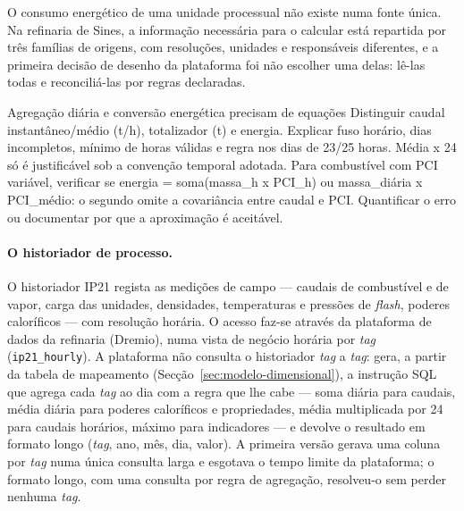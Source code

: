 O consumo energético de uma unidade processual não existe numa fonte
única. Na refinaria de Sines, a informação necessária para o calcular está
repartida por três famílias de origens, com resoluções, unidades e
responsáveis diferentes, e a primeira decisão de desenho da plataforma foi
não escolher uma delas: lê-las todas e reconciliá-las por regras
declaradas.

{Agregação diária e conversão energética precisam de equações}
{Distinguir caudal instantâneo/médio (t/h), totalizador (t) e energia.
Explicar fuso horário, dias incompletos, mínimo de horas válidas e regra
nos dias de 23/25 horas. Média x 24 só é justificável sob a convenção
temporal adotada. Para combustível com PCI variável, verificar se
energia = soma(massa\_h x PCI\_h) ou massa\_diária x PCI\_médio:
o segundo omite a covariância entre caudal e PCI. Quantificar o erro
ou documentar por que a aproximação é aceitável.}%
\paragraph{O historiador de processo.} O historiador IP21 regista as
medições de campo --- caudais de combustível e de vapor, carga das
unidades, densidades, temperaturas e pressões de \emph{flash}, poderes
caloríficos --- com resolução horária. O acesso faz-se através da
plataforma de dados da refinaria (Dremio), numa vista de negócio horária
por \emph{tag} (\texttt{ip21\_hourly}). A plataforma não consulta o
historiador \emph{tag} a \emph{tag}: gera, a partir da tabela de mapeamento
(Secção~\ref{sec:modelo-dimensional}), a instrução SQL que agrega cada
\emph{tag} ao dia com a regra que lhe cabe --- soma diária para caudais,
média diária para poderes caloríficos e propriedades, média multiplicada
por 24 para caudais horários, máximo para indicadores --- e devolve o
resultado em formato longo (\emph{tag}, ano, mês, dia, valor). A primeira
versão gerava uma coluna por \emph{tag} numa única consulta larga e
esgotava o tempo limite da plataforma; o formato longo, com uma consulta
por regra de agregação, resolveu-o sem perder nenhuma \emph{tag}.

